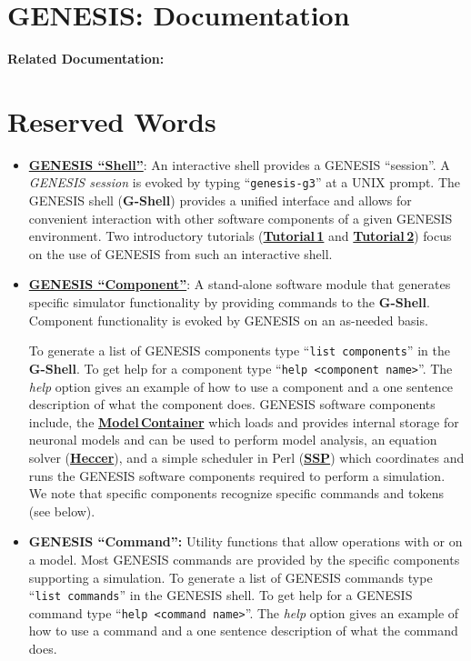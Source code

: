 \documentclass[12pt]{article}
\begin{document}
\section*{GENESIS: Documentation}

{\bf Related Documentation:}

\section*{Reserved Words}

\begin{itemize}

\item \href{../gshell/gshell.tex}{\bf GENESIS ``Shell''}: An interactive shell provides a GENESIS ``session''. A {\it GENESIS session} is evoked by typing ``{\tt genesis-g3}'' at a UNIX prompt. The GENESIS shell ({\bf G-Shell}) provides a unified interface and allows for convenient interaction with other software components of a given GENESIS environment.  Two introductory tutorials (\href{../tutorial1/tutorial1.tex}{\bf Tutorial\,1} and \href{../tutorial2/tutorial2.tex}{\bf Tutorial\,2}) focus on the use of GENESIS from such an interactive shell.

\item \href{./genesis-component/genesis-component.tex}{\bf GENESIS ``Component''}:  A stand-alone software module that generates specific simulator functionality by providing commands to the {\bf G-Shell}. Component functionality is evoked by GENESIS on an as-needed basis.

To generate a list of GENESIS components type ``{\tt list components}'' in the {\bf G-Shell}. To get help for a component type ``{\tt help <component name>}''. The {\it help} option gives an example of how to use a component and a one sentence description of what the component does. GENESIS software components include, the \href{../model-container/model-container.tex}{\bf Model\,Container} which loads and provides internal storage for neuronal models and can be used to perform model analysis, an equation solver (\href{../heccer/heccer.tex}{\bf Heccer}), and a simple scheduler in Perl (\href{../ssp/ssp.tex}{\bf SSP}) which coordinates and runs the GENESIS software components required to perform a simulation. We note that specific components recognize specific commands and tokens (see below).

\item {\bf GENESIS ``Command'':} Utility functions that allow operations with or on a model. Most GENESIS commands are provided by the specific components supporting a simulation. To generate a list of GENESIS commands type ``{\tt list commands}'' in the GENESIS shell. To get help for a GENESIS command type ``{\tt help <command name>}''. The {\it help} option gives an example of how to use a command and a one sentence description of what the command does.


\end{itemize}
\end{document}
